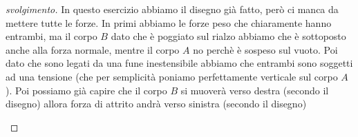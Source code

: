 \documentclass{rapport}
\begin{document}
\begin{proof}[svolgimento]
  
In questo esercizio abbiamo il disegno già fatto, però ci manca da mettere tutte le forze. In primi abbiamo le forze peso che chiaramente hanno entrambi, ma il corpo $B$ dato che è poggiato sul rialzo abbiamo che è sottoposto anche alla forza normale, mentre il corpo $A$ no perchè è sospeso sul vuoto. Poi dato che sono legati da una fune inestensibile abbiamo che entrambi sono soggetti ad una tensione (che per semplicità poniamo perfettamente verticale sul corpo $A$). Poi possiamo già capire che il corpo $B$ si muoverà verso destra (secondo il disegno)  allora forza di attrito andrà verso sinistra (secondo il disegno)

\begin{figure}[h]
  \centering

\end{figure}
\end{proof}
\end{document}
